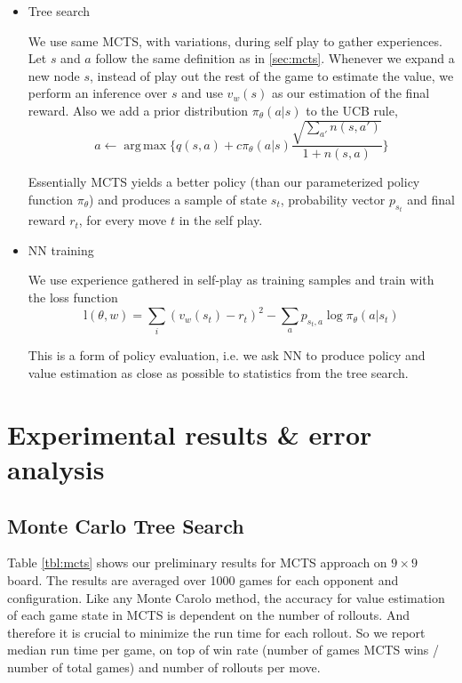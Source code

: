 \documentclass{article}
\DeclareMathOperator*{\argmax}{arg\,max}
\begin{document}
\begin{itemize}
  \item
    Tree search

    We use same MCTS,  with variations, during self play to gather experiences. Let $s$ and $a$ follow the same definition as in \ref{sec:mcts}. Whenever we expand a new node $s$, instead of play out the rest of the game to estimate the value, we perform an inference over $s$ and use $v_w(s)$ as our estimation of the final reward. Also we add a prior distribution $\pi_{\theta}(a|s)$ to the UCB rule,
$$a  \gets \argmax \{ q(s, a) + c \pi_{\theta}(a|s) \frac{\sqrt{\sum_{a'}n(s, a')}}{1 + n(s,a)} \}$$
   
Essentially MCTS yields a better policy (than our parameterized policy function $\pi_{\theta}$) and produces a sample of state $s_t$, probability vector $p_{s_t}$ and final reward $r_t$, for every move $t$ in the self play. 


  \item
    NN training
    
    We use experience gathered in self-play as training samples and train with the loss function
    $$ \text{l}(\theta, w) = \sum_i (v_w(s_t) - r_t)^2 - \sum_a p_{s_t, a} \log \pi_{\theta}(a|s_t)  $$
    
    This is a form of policy evaluation, i.e. we ask NN to produce policy and value estimation as close as possible to statistics from the tree search. 

\end{itemize}

\section{Experimental results \& error analysis}
\subsection{Monte Carlo Tree Search}
Table \ref{tbl:mcts} shows our preliminary results for MCTS approach on $9 \times 9$ board. The results are averaged over 1000 games for each opponent and configuration.  
Like any Monte Carolo method, the accuracy for value estimation of each game state in MCTS is dependent on the number of rollouts. And therefore it is crucial to minimize the run time for each rollout. So we report median run time per game, on top of win rate (number of games MCTS wins / number of total games) and number of rollouts per move. 
\end{document}
